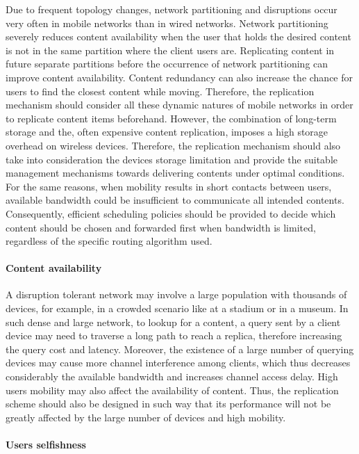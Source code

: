 Due to frequent topology changes, network partitioning and disruptions occur very often in mobile networks than in wired networks. Network partitioning severely reduces content availability when the user that holds the desired content is not in the same partition where the client users are. Replicating content
in future separate partitions before the occurrence of network partitioning can improve content availability. Content redundancy can also increase the chance for users to find the
closest content while moving. Therefore, the replication mechanism should consider all these dynamic natures of mobile networks in order to replicate content items beforehand. However, the combination of long-term storage and the, often expensive content replication, imposes a high storage overhead on wireless devices. Therefore, the replication mechanism should also take into consideration the devices storage limitation and provide the suitable management mechanisms towards delivering contents under optimal conditions. For the same reasons, when mobility results in short contacts between users, available bandwidth could be insufficient to communicate all intended contents. Consequently, efficient scheduling policies should be provided to decide which content should be chosen and forwarded first when bandwidth is limited, regardless of the specific routing algorithm used.

\paragraph{Content availability}

A disruption tolerant network may involve a large population with thousands of devices, for example, in a crowded scenario like at a stadium or in a museum. In such dense and
large network, to lookup for a content, a query sent by a client device may need to traverse a long path to reach a replica, therefore increasing the query cost and latency. Moreover, the
existence of a large number of querying devices may cause more channel interference among clients, which thus decreases considerably the available bandwidth and increases channel
access delay. High users mobility may also affect the availability of content. Thus, the replication scheme should also be designed in such way that its performance will not be greatly affected by the large number of devices and high mobility.

\paragraph{Users selfishness}

